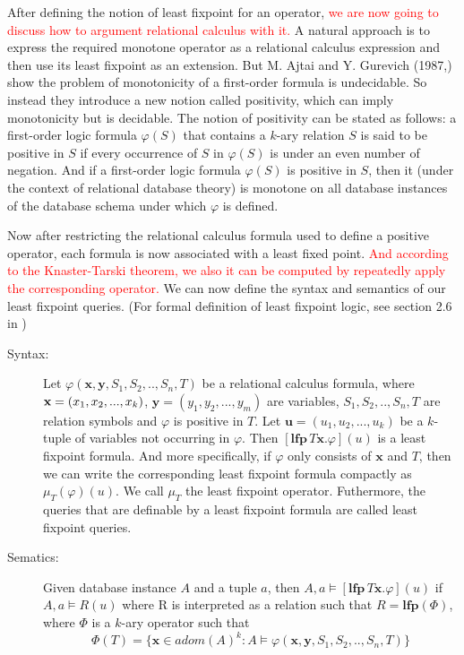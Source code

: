 After defining the notion of least fixpoint for an operator, \textcolor{red}{we are now going to discuss how to argument relational calculus with it.} A natural approach is to express the required monotone operator as a relational calculus expression and then use its least fixpoint as an extension. But M. Ajtai and Y. Gurevich (1987,\cite{Ajtai}) show the problem of monotonicity of a first-order formula is undecidable. So instead they introduce a new notion called positivity, which can imply monotonicity but is decidable. The notion of positivity can be stated as follows: a first-order logic formula $\varphi(S)$ that contains a $k$-ary relation $S$ is said to be positive in $S$ if every occurrence of $S$ in $\varphi(S)$ is under an even number of negation. And if a first-order logic formula $\varphi(S)$ is positive in $S$, then it (under the context of relational database theory) is monotone on all database instances of the database schema under which $\varphi$ is defined.

Now after restricting the relational calculus formula used to define a positive operator, each formula is now associated with a least fixed point. \textcolor{red}{And according to the Knaster-Tarski theorem, we also it can be computed by repeatedly apply the corresponding operator.} We can now define the syntax and semantics of our least fixpoint queries. (For formal definition of least fixpoint logic, see section 2.6 in \cite{kolaitis1})\\

\begin{description}

\item[Syntax:]
Let $\varphi(\textbf{x},\textbf{y}, S_1,S_2,..,S_n, T)$ be a relational calculus formula, where $\textbf{x}=(x_1, \\x_2,...,x_k)$, $\textbf{y}=(y_1,y_2,...,y_m)$ are variables, $S_1,S_2,..,S_n, T$ are relation symbols and $\varphi$ is positive in $T$. Let $\textbf{u}=(u_1, u_2,...,u_k)$ be a $k$-tuple of variables not occurring in $\varphi$. Then $[\textbf{lfp}\,T\textbf{x}.\varphi](u)$ is a least fixpoint formula. And more specifically, if $\varphi$ only consists of $\textbf{x}$ and $T$, then we can write the corresponding least fixpoint formula compactly as $\mu_T(\varphi)(u)$. We call $\mu_T$ the least fixpoint operator. Futhermore, the queries that are definable by a least fixpoint formula are called least fixpoint queries.

\item[Sematics:]
Given database instance $A$ and a tuple $a$, then $A, a \models [\textbf{lfp}\,T\textbf{x}.\varphi](u)$ if $A, a \models R(u)$ where R is interpreted as a relation such that $R=\textbf{lfp}(\Phi)$, where $\Phi$ is a $k$-ary operator such that
$$ \Phi(T) = \{\textbf{x}\in adom(A)^k: A\models \varphi(\textbf{x},\textbf{y},S_1,S_2,..,S_n,T)\}$$ 

\end{description}

